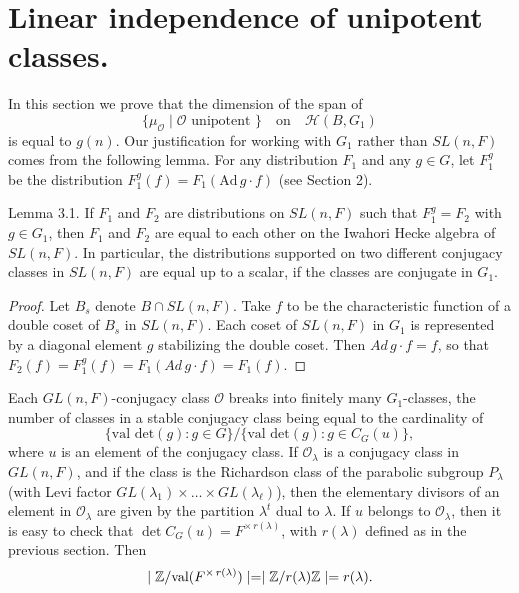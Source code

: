\documentclass{amsart}
\begin{document}
\section{{Linear independence of unipotent classes.}}

\medskip
\noindent
In this section we prove that the dimension of the span of
%
$$
  \{ \mu_{\mathcal O} \mid
     {\mathcal O} \text{ unipotent } \} 
  \quad \text{on} \quad
  {\mathcal H} (B, G_1)
$$
%
is equal to 
  $ g(n) $.  Our justification for working with $G_1$ rather
  than $SL(n,F)$ comes from the following lemma.
  For any distribution $F_1$ and any $g\in G$, let $F^g_1$ be the distribution
  $F^g_1(f) = F_1(\text{Ad}\,g\cdot f)$ (see Section 2).

\proclaim Lemma {3.1}.
If
  $ {F}_1$ and ${F}_2 $
are distributions on 
  $ SL(n,F) $
such that
  $ {F}_1^g = 
    {F}_2 $
with $g\in G_1$, then
  $ F_1$ and $F_2$ 
are equal to each other on
the Iwahori Hecke algebra of $SL(n,F)$.
In particular, the distributions supported on two different conjugacy
classes in $SL(n,F)$ are equal up to a scalar, if the classes are
conjugate in $G_1$.
\finishproclaim

\begin{proof}
Let $B_s$ denote $B\cap SL(n,F)$.
Take
  $f$ to be the characteristic function of 
  a double coset of $B_s$ in $SL(n,F)$.
  Each coset of $SL(n,F)$ in $G_1$ is represented by a diagonal element
  $g$ stabilizing the double coset.
Then
  $ Ad \, g \cdot f = f $,
so that
  $ F_2 (f) =
    F_1^g (f) =
    F_1 (Ad \, g \cdot f) =
    F_1 (f) $.
\end{proof}

Each $GL(n,F)$-conjugacy class
  $ {\mathcal O} $
breaks into finitely many 
  $ G_1 $-classes, the
  number of classes in a stable conjugacy class
  being equal to the cardinality of
%
$$
  \bigl\{
    \text{val det}(g):
    g \in G
  \bigr\}
  \big/
  \bigl\{
    \text{val det}(g):
    g \in C_{G} (u)
  \bigr\},
$$
%
where $u$ is an element of the conjugacy class.
If 
  $ {\mathcal O}_{\lambda} $
is a conjugacy class in $GL(n,F)$, and if the class is 
the Richardson class of the
  parabolic subgroup 
  $ P_{\lambda} $
(with Levi factor
  $ GL (\lambda_1) \times \dots \times GL(\lambda_{\ell}) $),
then the elementary divisors of an element in
  $ {\mathcal O}_{\lambda} $
are given by the partition $\lambda^t$ dual to $\lambda$.  
If $u$ belongs to ${\mathcal O}_\lambda$, then it is easy to check that
  $ \det C_G (u) = F^{\times\,r(\lambda)} $,
with
  $ r(\lambda) $
defined as in the previous section.
Then
%
$$
  \mid 
      {\Bbb Z} / \text{val}(F^{\times\,r(\lambda)})
     \mid =
  \mid 
      {\Bbb Z} / r(\lambda) {\Bbb Z}
      \mid
     = r(\lambda) .
$$
%
\end{document}
